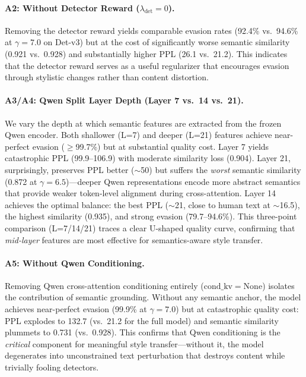 \paragraph{A2: Without Detector Reward ($\lambda_{\mathrm{det}}{=}0$).}
Removing the detector reward yields comparable evasion rates (92.4\% vs.\ 94.6\% at $\gamma{=}7.0$ on Det-v3) but at the cost of significantly worse semantic similarity (0.921 vs.\ 0.928) and substantially higher PPL (26.1 vs.\ 21.2).
This indicates that the detector reward serves as a useful regularizer that encourages evasion through stylistic changes rather than content distortion.

\paragraph{A3/A4: Qwen Split Layer Depth (Layer 7 vs.\ 14 vs.\ 21).}
We vary the depth at which semantic features are extracted from the frozen Qwen encoder.
Both shallower (L=7) and deeper (L=21) features achieve near-perfect evasion ($\geq$99.7\%) but at substantial quality cost.
Layer 7 yields catastrophic PPL (99.9--106.9) with moderate similarity loss (0.904).
Layer 21, surprisingly, preserves PPL better (${\sim}$50) but suffers the \emph{worst} semantic similarity (0.872 at $\gamma{=}6.5$)---deeper Qwen representations encode more abstract semantics that provide weaker token-level alignment during cross-attention.
Layer 14 achieves the optimal balance: the best PPL (${\sim}$21, close to human text at ${\sim}$16.5), the highest similarity (0.935), and strong evasion (79.7--94.6\%).
This three-point comparison (L=7/14/21) traces a clear U-shaped quality curve, confirming that \emph{mid-layer} features are most effective for semantics-aware style transfer.

\paragraph{A5: Without Qwen Conditioning.}
Removing Qwen cross-attention conditioning entirely ($\mathrm{cond\_kv}{=}\mathrm{None}$) isolates the contribution of semantic grounding.
Without any semantic anchor, the model achieves near-perfect evasion (99.9\% at $\gamma{=}7.0$) but at catastrophic quality cost: PPL explodes to 132.7 (vs.\ 21.2 for the full model) and semantic similarity plummets to 0.731 (vs.\ 0.928).
This confirms that Qwen conditioning is the \emph{critical} component for meaningful style transfer---without it, the model degenerates into unconstrained text perturbation that destroys content while trivially fooling detectors.

